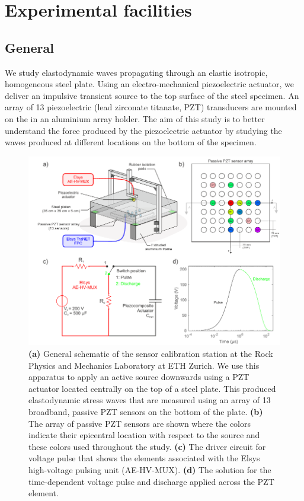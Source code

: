 \documentclass[preprint,3p, 11pt,authoryear]{elsarticle}
\begin{document}
\section{Experimental facilities}
\label{ExpFac}
\subsection{General}

We study elastodynamic waves propagating through an elastic isotropic, homogeneous steel plate. Using an electro-mechanical piezoelectric actuator, we deliver an impulsive transient source to the top surface of the steel specimen. An array of 13 piezoelectric (lead zirconate titanate, PZT) transducers are mounted on the  in an aluminium array holder. The aim of this study is to better understand the force produced by the piezoelectric actuator by studying the waves produced at different locations on the bottom of the specimen.

\begin{figure}[ht]
     	\centering
\includegraphics[scale= 1.0]{FIG1.pdf} 
\caption{\textbf{(a)} General schematic of the sensor calibration station at the Rock Physics and Mechanics Laboratory at ETH Zurich. We use this apparatus to apply an active source downwards using a PZT actuator located centrally on the top of a steel plate. This produced elastodynamic stress waves that are measured using an array of 13 broadband, passive PZT sensors on the bottom of the plate. \textbf{(b)} The array of passive PZT sensors are shown where the colors indicate their epicentral location with respect to the source and these colors used throughout the study. \textbf{(c)} The driver circuit for voltage pulse that shows the elements associated with the Elsys high-voltage pulsing unit (AE-HV-MUX). \textbf{(d)} The solution for the time-dependent voltage pulse and discharge applied across the PZT element. }
	\label{fig1} 
\end{figure}
\end{document}
